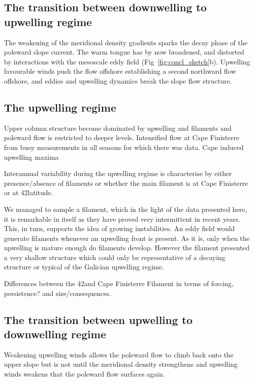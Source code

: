 \subsection{The transition between downwelling to upwelling regime}
The weakening of the meridional density gradients sparks the decay
phase of the poleward slope current. The warm tongue has by now
broadened, and distorted by interactions with the mesoscale eddy
field (Fig~\ref{fig:concl_sketch}b). Upwelling favourable winds
push the flow offshore establishing a second northward flow
offshore, and eddies and upwelling dynamics break the slope flow
structure.
\subsection{The upwelling regime}
Upper column structure become dominated by upwelling and filaments
and poleward flow is restricted to deeper levels. Intensified flow
at Cape Finisterre from buoy measurements in all seasons for which
there was data. Cape induced upwelling maxima \citep{Rosenfeld94}

Interannual variability during the upwelling regime is
characterise by either presence/absence of filaments or whether
the main filament is at Cape Finisterre or at 42\deg latitude.

We managed to sample a filament, which in the light of the data
presented here, it is remarkable in itself as they have proved
very intermittent in recent years. This, in turn, supports the
idea of growing instabilities. An eddy field would generate
filaments whenever an upwelling front is present. As it is, only
when the upwelling is mature enough do filaments develop. However
the filament presented a very shallow structure which could only
be representative of a decaying structure or typical of the
Galician upwelling regime.

Differences between the 42\deg and Cape Finisterre Filament in
terms of forcing, persistence? and size/consequences.

\subsection{The transition between upwelling to downwelling
regime}
Weakening upwelling winds allows the poleward flow to climb back
onto the upper slope but is not until the meridional density
strengthens and upwelling winds weakens that the poleward flow
surfaces again.

